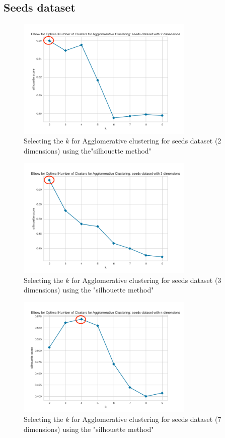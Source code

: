 \subsection{Seeds dataset}
\begin{figure}[H]
  \includegraphics[width=0.75\textwidth]{Method/images/k-values/seeds-dataset-2-agglomerative.png}
  \caption{Selecting the $k$ for Agglomerative clustering for seeds dataset (2 dimensions) using the"silhouette method"}
  \label{hyperparameters:agglomerative-seeds-dataset-2d}
\end{figure}
\begin{figure}[H]
  \includegraphics[width=0.75\textwidth]{Method/images/k-values/seeds-dataset-3-agglomerative.png}
  \caption{Selecting the $k$ for Agglomerative clustering for seeds dataset (3 dimensions) using the "silhouette method"}
  \label{hyperparameters:agglomerative-seeds-dataset-3d}
\end{figure}
\begin{figure}[H]
  \includegraphics[width=0.75\textwidth]{Method/images/k-values/seeds-dataset-n-agglomerative.png}
  \caption{Selecting the $k$ for Agglomerative clustering for seeds dataset (7 dimensions) using the "silhouette method"}
  \label{hyperparameters:agglomerative-seeds-dataset-7d}
\end{figure}
\newpage

